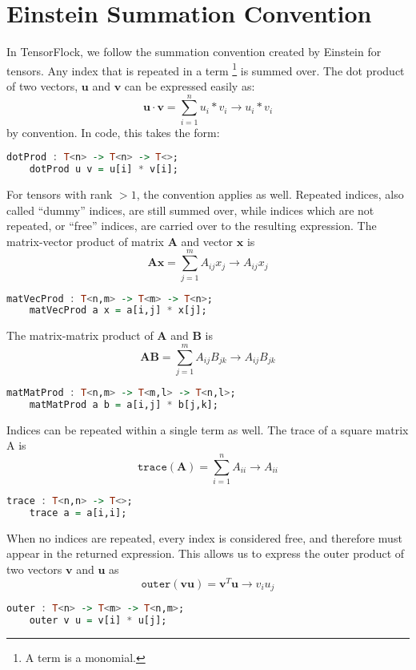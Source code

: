 \pagebreak
\section{Einstein Summation Convention}%
\label{sec:einstein_summation_convention}

In TensorFlock, we follow the summation convention created by Einstein for
tensors. Any index that is repeated in a term \footnote{A term is a monomial.}  
is summed over. The dot product of two vectors, $\mathbf{u}$ and $\mathbf{v}$
can be expressed easily as: 
\[\mathbf{u} \cdot \mathbf{v} = \sum^{n}_{i=1} u_i * v_i \rightarrow u_i * v_i\] by
convention. In code, this takes the form:
\begin{lstlisting}[language=haskell]
    dotProd : T<n> -> T<n> -> T<>;
    dotProd u v = u[i] * v[i];
\end{lstlisting}

For tensors with rank $> 1$, the convention applies as well. Repeated indices,
also called ``dummy'' indices, are still summed over, while indices which are
not repeated, or ``free'' indices, are carried over to the resulting
expression. The matrix-vector product of matrix $\mathbf{A}$ and vector
$\mathbf{x}$ is  
\[ \mathbf{A} \mathbf{x} = \sum^{m}_{j=1} A_{ij} x_j \rightarrow A_{ij} x_j \]
\begin{lstlisting}[language=haskell]
    matVecProd : T<n,m> -> T<m> -> T<n>;
    matVecProd a x = a[i,j] * x[j];
\end{lstlisting}

The matrix-matrix product of $ \mathbf{A} $ and $ \mathbf{B} $ is 
\[ \mathbf{A} \mathbf{B} = \sum^{m}_{j=1} A_{ij} B_{jk} 
   \rightarrow A_{ij} B_{jk} \]
\begin{lstlisting}[language=haskell]
    matMatProd : T<n,m> -> T<m,l> -> T<n,l>;
    matMatProd a b = a[i,j] * b[j,k];
\end{lstlisting}

Indices can be repeated within a single term as well. The trace of a square
matrix A is \[ \texttt{trace}( \mathbf{A} ) = \sum^{n}_{i=1} A_{ii} \rightarrow A_{ii}\] 
\begin{lstlisting}[language=haskell]
    trace : T<n,n> -> T<>;
    trace a = a[i,i];
\end{lstlisting}

When no indices are repeated, every index is considered free, and therefore
must appear in the returned expression. This allows us to express the outer
product of two vectors $ \mathbf{v} $ and $ \mathbf{u} $ as 
\[ \texttt{outer} (\mathbf{v} \mathbf{u}) = \mathbf{v}^T \mathbf{u} \rightarrow  v_i u_j\]
\begin{lstlisting}[language=haskell]
    outer : T<n> -> T<m> -> T<n,m>;
    outer v u = v[i] * u[j];
\end{lstlisting}

